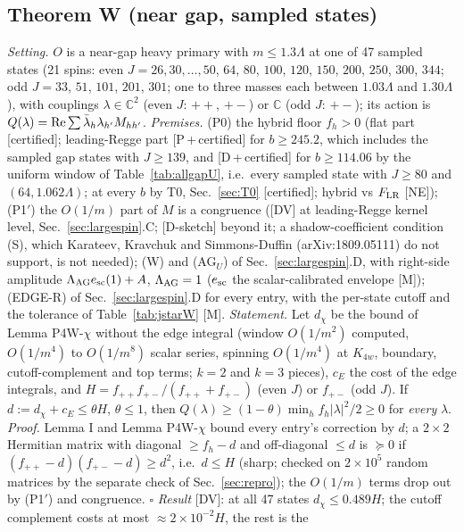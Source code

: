 \documentclass[aps,prl,onecolumn,superscriptaddress,nofootinbib]{revtex4-2}
\begin{document}
\subsection{Theorem W (near gap, sampled states)}
\emph{Setting.} $O$ is a near-gap heavy primary with $m\le1.3\Lambda$ at one of 47 sampled states (21 spins: even
$J=26,30,\dots,50$, $64$, $80$, $100$, $120$, $150$, $200$, $250$, $300$, $344$; odd $J=33$, $51$, $101$, $201$, $301$; one to three
masses each between $1.03\Lambda$ and $1.30\Lambda$), with couplings $\lambda\in\mathbb C^2$ (even $J$: $++$, $+-$) or $\mathbb C$
(odd $J$: $+-$); its action is $Q(\lambda)={\rm Re}\sum\bar\lambda_h\lambda_{h'}M_{hh'}$.
\emph{Premises.}
(P0) the hybrid floor $f_h>0$ (flat part [certified]; leading-Regge part [P\,+\,certified] for $b\ge245.2$, which includes the
sampled gap states with $J\ge139$, and [D\,+\,certified] for $b\ge114.06$ by the uniform window of Table~\ref{tab:allgapU}, i.e.\ every
sampled state with $J\ge80$ and $(64,1.062\Lambda)$; at every $b$ by T0, Sec.~\ref{sec:T0} [certified]; hybrid vs $F_{\rm LR}$ [NE]);
(P1$'$) the $O(1/m)$ part of $M$ is a congruence ([DV] at leading-Regge kernel level, Sec.~\ref{sec:largespin}.C; [D-sketch]
beyond it; a shadow-coefficient condition (S), which Karateev, Kravchuk and Simmons-Duffin (arXiv:1809.05111) do not support, is not needed);
(W) and (AG$_U$) of Sec.~\ref{sec:largespin}.D, with right-side amplitude $\Lambda_{\rm AG}e_{\rm sc}(1)+A$, $\Lambda_{\rm AG}=1$ ($e_{\rm sc}$
the scalar-calibrated envelope [M]); (EDGE-R) of Sec.~\ref{sec:largespin}.D for every entry, with the per-state cutoff and the
tolerance of Table~\ref{tab:jstarW} [M].
\emph{Statement.} Let $d_\chi$ be the bound of Lemma P4W-$\chi$ without the edge integral (window $O(1/m^2)$ computed, $O(1/m^4)$ to
$O(1/m^8)$ scalar series, spinning $O(1/m^4)$ at $K_{4w}$, boundary, cutoff-complement and top terms; $k=2$ and $k=3$ pieces),
$c_E$ the cost of the edge integrals, and $H=f_{++}f_{+-}/(f_{++}+f_{+-})$ (even $J$) or $f_{+-}$ (odd $J$). If $d:=d_\chi+c_E\le\theta H$,
$\theta\le1$, then $Q(\lambda)\ge(1-\theta)\min_hf_h|\lambda|^2/2\ge0$ for \emph{every} $\lambda$.
\emph{Proof.} Lemma I and Lemma P4W-$\chi$ bound every entry's correction by $d$; a $2\times2$ Hermitian matrix with diagonal
$\ge f_h-d$ and off-diagonal $\le d$ is $\succeq0$ if $(f_{++}-d)(f_{+-}-d)\ge d^2$, i.e.\ $d\le H$ (sharp; checked on $2\times10^5$
random matrices by the separate check of Sec.~\ref{sec:repro}); the $O(1/m)$ terms drop out by (P1$'$) and congruence. $\square$
\emph{Result} [DV]: at all 47 states $d_\chi\le0.489H$; the cutoff complement costs at most $\approx2\times10^{-2}H$, the rest is the
\end{document}
